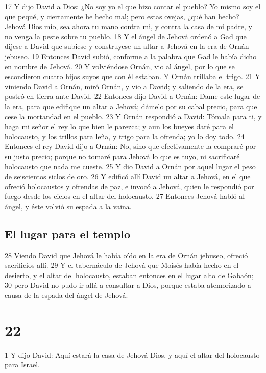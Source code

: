 17 Y dijo David a Dios: ¿No soy yo el que hizo contar el pueblo? Yo mismo soy el que pequé, y ciertamente he hecho mal; pero estas ovejas, ¿qué han hecho? Jehová Dios mío, sea ahora tu mano contra mi, y contra la casa de mi padre, y no venga la peste sobre tu pueblo.
18 Y el ángel de Jehová ordenó a Gad que dijese a David que subiese y construyese un altar a Jehová en la era de Ornán jebuseo.
19 Entonces David subió, conforme a la palabra que Gad le había dicho en nombre de Jehová.
20 Y volviéndose Ornán, vio al ángel, por lo que se escondieron cuatro hijos suyos que con él estaban. Y Ornán trillaba el trigo.
21 Y viniendo David a Ornán, miró Ornán, y vio a David; y saliendo de la era, se postró en tierra ante David.
22 Entonces dijo David a Ornán: Dame este lugar de la era, para que edifique un altar a Jehová; dámelo por su cabal precio, para que cese la mortandad en el pueblo.
23 Y Ornán respondió a David: Tómala para ti, y haga mi señor el rey lo que bien le parezca; y aun los bueyes daré para el holocausto, y los trillos para leña, y trigo para la ofrenda; yo lo doy todo.
24 Entonces el rey David dijo a Ornán: No, sino que efectivamente la compraré por su justo precio; porque no tomaré para Jehová lo que es tuyo, ni sacrificaré holocausto que nada me cueste.
25 Y dio David a Ornán por aquel lugar el peso de seiscientos siclos de oro.
26 Y edificó allí David un altar a Jehová, en el que ofreció holocaustos y ofrendas de paz, e invocó a Jehová, quien le respondió por fuego desde los cielos en el altar del holocausto.
27 Entonces Jehová habló al ángel, y éste volvió su espada a la vaina.

\section*{El lugar para el templo}

28 Viendo David que Jehová le había oído en la era de Ornán jebuseo, ofreció sacrificios allí.
29 Y el tabernáculo de Jehová que Moisés había hecho en el desierto, y el altar del holocausto, estaban entonces en el lugar alto de Gabaón;
30 pero David no pudo ir allá a consultar a Dios, porque estaba atemorizado a causa de la espada del ángel de Jehová.

\chapter{22}

1 Y dijo David: Aquí estará la casa de Jehová Dios, y aquí el altar del holocausto para Israel.

